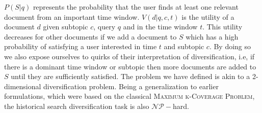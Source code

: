 $P(S|q)$ represents the probability that the user finds at least one relevant document from an important time window. 
$V(d|q,c,t)$ is the utility of a document $d$ given subtopic $c$, query $q$ and in the time window $t$. This utility decreases for other documents if we add a document to $S$ which has a high probability of satisfying a user interested in time $t$ and subtopic $c$. By doing so we also expose ourselves to quirks of their interpretation of diversification, i.e, if there is a dominant time window or subtopic then more documents are added to $S$ until they are sufficiently satisfied. The problem we have defined is akin to a 2-dimensional diversification problem. Being a generalization to earlier formulations, which were based on the classical \textsc{Maximum k-Coverage Problem}, the historical search diversification task is also $\mathcal{NP}-$hard.  




